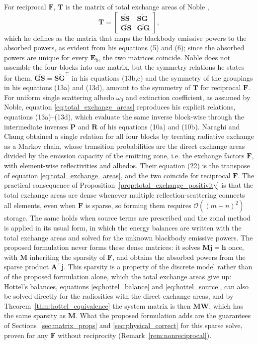 \documentclass[preprint,1p,times]{elsarticle}
\theoremstyle{plain}
\theoremstyle{definition}
\theoremstyle{remark}
\begin{document}
For reciprocal $\mathbf{F}$, $\mathbf{T}$ is the matrix of total exchange areas of Noble \citep{Noble1975},
\begin{equation}
\mathbf{T} =
\begin{bmatrix}
\overline{\mathbf{SS}} & \overline{\mathbf{SG}} \\
\overline{\mathbf{GS}} & \overline{\mathbf{GG}}
\end{bmatrix} ,
\label{eq:total_exchange_blocks}
\end{equation}
which he defines as the matrix that maps the blackbody emissive powers to the absorbed powers, as evident from his equations (5) and (6); since the absorbed powers are unique for every $\mathbf{E}_\mathrm{b}$, the two matrices coincide. Noble does not assemble the four blocks into one matrix, but the symmetry relations he states for them, $\overline{\mathbf{GS}} = \overline{\mathbf{SG}}^\top$ in his equations (13b,c) and the symmetry of the groupings in his equations (13a) and (13d), amount to the symmetry of $\mathbf{T}$ for reciprocal $\mathbf{F}$. For uniform single scattering albedo $\omega_0$ and extinction coefficient, as assumed by Noble, equation \eqref{eq:total_exchange_areas} reproduces his explicit relations, equations (13a)--(13d), which evaluate the same inverse block-wise through the intermediate inverses $\mathbf{P}$ and $\mathbf{R}$ of his equations (10a) and (10b). Naraghi and Chung \citep{Naraghi1985} obtained a single relation for all four blocks by treating radiative exchange as a Markov chain, whose transition probabilities are the direct exchange areas divided by the emission capacity of the emitting zone, i.e. the exchange factors $\mathbf{F}$, with element-wise reflectivities and albedos. Their equation (22) is the transpose of equation \eqref{eq:total_exchange_areas}, and the two coincide for reciprocal $\mathbf{F}$. The practical consequence of Proposition~\ref{prop:total_exchange_positivity} is that the total exchange areas are dense whenever multiple reflection-scattering connects all elements, even when $\mathbf{F}$ is sparse, so forming them requires $\mathcal{O}\left((m+n)^2\right)$ storage. The same holds when source terms are prescribed and the zonal method is applied in its usual form, in which the energy balances are written with the total exchange areas and solved for the unknown blackbody emissive powers. The proposed formulation never forms these dense matrices: it solves $\mathbf{M}\mathbf{j} = \mathbf{h}$ once, with $\mathbf{M}$ inheriting the sparsity of $\mathbf{F}$, and obtains the absorbed powers from the sparse product $\mathbf{A}^\top\mathbf{j}$. This sparsity is a property of the discrete model rather than of the proposed formulation alone, which the total exchange areas give up: Hottel's balances, equations \eqref{eq:hottel_balance} and \eqref{eq:hottel_source}, can also be solved directly for the radiosities with the direct exchange areas, and by Theorem~\ref{thm:hottel_equivalence} the system matrix is then $\mathbf{M}\mathbf{W}$, which has the same sparsity as $\mathbf{M}$. What the proposed formulation adds are the guarantees of Sections~\ref{sec:matrix_props} and \ref{sec:physical_correct} for this sparse solve, proven for any $\mathbf{F}$ without reciprocity (Remark~\ref{rem:nonreciprocal}).
\end{document}
